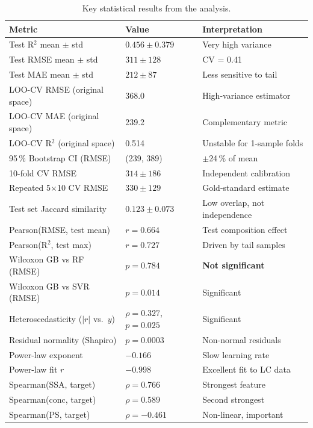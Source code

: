 \documentclass[12pt,a4paper]{article}
\begin{document}
\begin{table}[h]
\centering
\caption{Key statistical results from the analysis.}
\label{tab:stats_summary}
\begin{tabular}{lll}
\toprule
Metric & Value & Interpretation \\
\midrule
Test R$^2$ mean $\pm$ std & $0.456 \pm 0.379$ & Very high variance \\
Test RMSE mean $\pm$ std & $311 \pm 128$ & CV = 0.41 \\
Test MAE mean $\pm$ std & $212 \pm 87$ & Less sensitive to tail \\
LOO-CV RMSE (original space) & 368.0 & High-variance estimator \\
LOO-CV MAE  (original space) & 239.2 & Complementary metric \\
LOO-CV R$^2$ (original space) & 0.514 & Unstable for 1-sample folds \\
95\,\% Bootstrap CI (RMSE) & (239, 389) & $\pm$24\,\% of mean \\
10-fold CV RMSE & $314 \pm 186$ & Independent calibration \\
Repeated 5$\times$10 CV RMSE & $330 \pm 129$ & Gold-standard estimate \\
Test set Jaccard similarity & $0.123 \pm 0.073$ & Low overlap, not independence \\
Pearson(RMSE, test mean) & $r = 0.664$ & Test composition effect \\
Pearson(R$^2$, test max) & $r = 0.727$ & Driven by tail samples \\
Wilcoxon GB vs RF (RMSE) & $p = 0.784$ & \textbf{Not significant} \\
Wilcoxon GB vs SVR (RMSE) & $p = 0.014$ & Significant \\
Heteroscedasticity ($|r|$ vs.\ $y$) & $\rho = 0.327$, $p = 0.025$ & Significant \\
Residual normality (Shapiro) & $p = 0.0003$ & Non-normal residuals \\
Power-law exponent & $-0.166$ & Slow learning rate \\
Power-law fit $r$ & $-0.998$ & Excellent fit to LC data \\
\midrule
Spearman(SSA, target) & $\rho = 0.766$ & Strongest feature \\
Spearman(conc, target) & $\rho = 0.589$ & Second strongest \\
Spearman(PS, target) & $\rho = -0.461$ & Non-linear, important \\
\bottomrule
\end{tabular}
\end{table}
\end{document}
